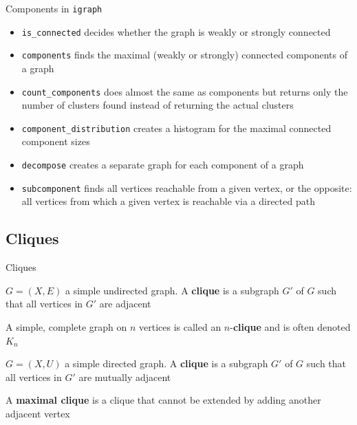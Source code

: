 \documentclass[aspectratio=43]{beamer}
\begin{document}
\begin{frame}{Components in {\tt igraph}}
\begin{itemize}
	\item {\tt is\_connected} decides whether the graph is weakly or strongly connected
	\item {\tt components} finds the maximal (weakly or strongly) connected components of a graph
	\item {\tt count\_components} does almost the same as components but returns only the number of clusters found instead of returning the actual clusters
	\item {\tt component\_distribution} creates a histogram for the maximal connected component sizes
	\item {\tt decompose} creates a separate graph for each component of a graph
	\item {\tt subcomponent} finds all vertices reachable from a given vertex, or the opposite: all vertices from which a given vertex is reachable via a directed path
\end{itemize}
\end{frame}
	
\subsection{Cliques}

\begin{frame}{Cliques}
	\begin{definition}
		$G=(X,E)$ a simple undirected graph. A \textbf{clique} is a subgraph $G'$ of $G$ such that all vertices in $G'$ are adjacent
	\end{definition}
	\begin{definition}[$n$-clique]
		A simple, complete graph on $n$ vertices is called an $n$-\textbf{clique} and is often denoted $K_n$
	\end{definition}
	\begin{definition}
		$G=(X,U)$ a simple directed graph. A \textbf{clique} is a subgraph $G'$ of $G$ such that all vertices in $G'$ are mutually adjacent
	\end{definition}
	\begin{definition}
		A \textbf{maximal clique} is a clique that cannot be extended by adding another adjacent vertex
	\end{definition}
\end{frame}
\end{document}
